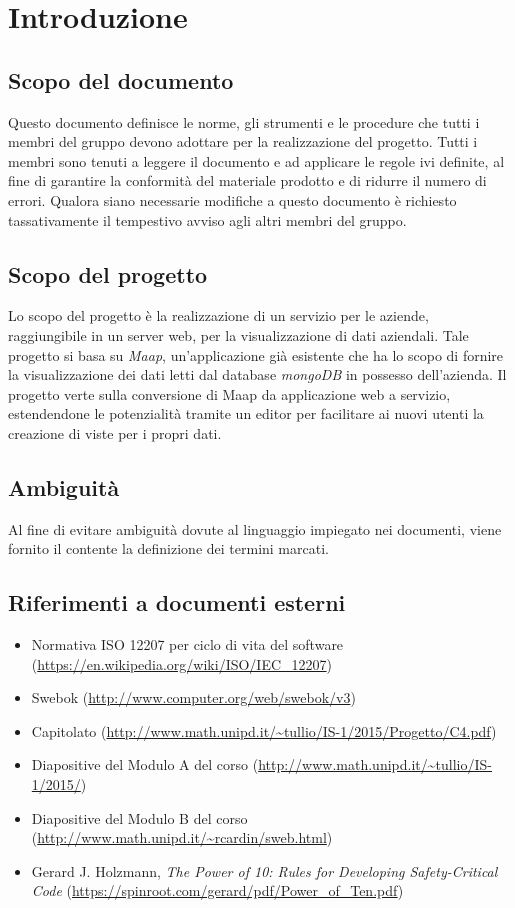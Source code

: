 \section{Introduzione}
\subsection{Scopo del documento}
Questo documento definisce le norme, gli strumenti e le procedure che tutti i membri del gruppo devono adottare per la realizzazione del progetto. Tutti i membri sono tenuti a leggere il documento e ad applicare le regole ivi definite, al fine di garantire la conformità del materiale prodotto e di ridurre il numero di errori. Qualora siano necessarie modifiche a questo documento è richiesto tassativamente il tempestivo avviso agli altri membri del gruppo.

\subsection{Scopo del progetto}
Lo scopo del progetto è la realizzazione di un servizio per le aziende, raggiungibile in un server web, per la visualizzazione di dati aziendali. Tale progetto si basa su \textit{Maap}, un'applicazione già esistente che ha lo scopo di fornire la visualizzazione dei dati letti dal database \textit{mongoDB} in possesso dell'azienda. Il progetto verte sulla conversione di Maap da applicazione web a servizio, estendendone le potenzialità tramite un editor per facilitare ai nuovi utenti la creazione di viste per i propri dati.

\subsection{Ambiguit\`a}
Al fine di evitare ambiguità dovute al linguaggio impiegato nei documenti, viene fornito il \Glossario contente la definizione dei termini marcati.

\subsection{Riferimenti a documenti esterni}
\begin{itemize}
\item Normativa ISO 12207 per ciclo di vita del software (\url{https://en.wikipedia.org/wiki/ISO/IEC_12207})

\item Swebok (\url{http://www.computer.org/web/swebok/v3})
\item Capitolato (\url{http://www.math.unipd.it/~tullio/IS-1/2015/Progetto/C4.pdf})
\item Diapositive del Modulo A del corso (\url{http://www.math.unipd.it/~tullio/IS-1/2015/})
\item Diapositive del Modulo B del corso (\url{http://www.math.unipd.it/~rcardin/sweb.html})
\item Gerard J. Holzmann, \textit{The Power of 10: Rules for Developing Safety-Critical Code} 
	(\url{https://spinroot.com/gerard/pdf/Power_of_Ten.pdf})
\end{itemize}

